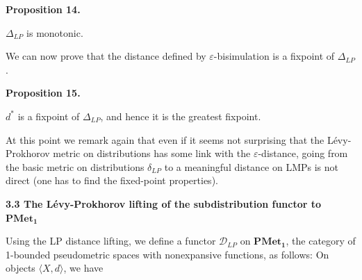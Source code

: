  
 
\par\medskip\noindent\textbf{Proposition 14.}\par
 
 
$\Delta_{LP}$ is monotonic.\par
 
 
 
 
We can now prove that the distance defined by $\varepsilon$-bisimulation is a fixpoint of $\Delta_{LP}$.\par
 
 
 
\par\medskip\noindent\textbf{Proposition 15.}\par
 
 
$d^{*}$ is a fixpoint of $\Delta_{LP}$, and hence it is the greatest fixpoint.\par
 
 
 
 
At this point we remark again that even if it seems not surprising that the Lévy-Prokhorov metric on distributions has some link with the $\varepsilon$-distance, going from the basic metric on distributions $\delta_{LP}$ to a meaningful distance on LMPs is not direct (one has to find the fixed-point properties).\par
 
 
 
 
 
\par\medskip\noindent\textbf{3.3 The Lévy-Prokhorov lifting of the subdistribution functor to $\mathbf{PMet_{1}}$}\par
 
 
Using the LP distance lifting, we define a functor $\mathcal{D}_{LP}$ on $\mathbf{PMet_{1}}$, the category of 1-bounded pseudometric spaces with nonexpansive functions, as follows: On objects $\langle X,d\rangle$, we have\par
  
